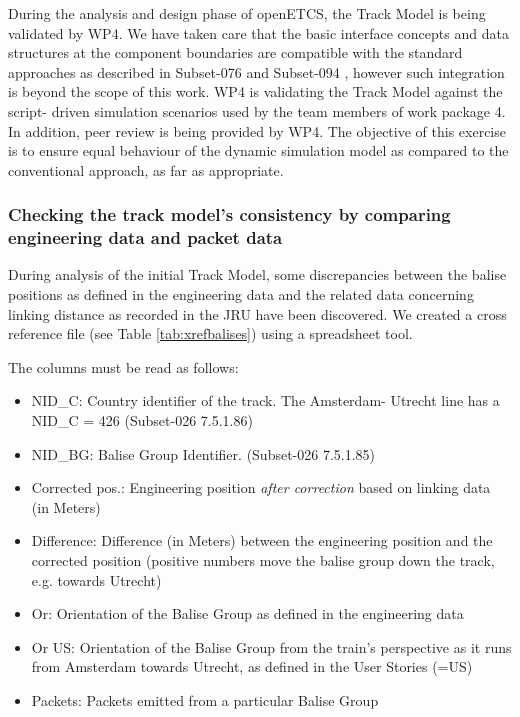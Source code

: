 \documentclass{template/openetcs_article}
\begin{document}
During the analysis and design phase of openETCS, the Track Model is being validated by WP4. We have taken care that the basic interface concepts and data structures at the component boundaries are compatible with the standard approaches as described in Subset-076 \cite{Subset076} and Subset-094 \cite{Subset094}, however such integration is beyond the scope of this work.\newline 
WP4 is validating the Track Model against the script- driven simulation scenarios used by the team members of work package 4. In addition, peer review is being provided by WP4.\newline
The objective of this exercise is to ensure equal behaviour of the dynamic simulation model as compared to the conventional approach, as far as appropriate. 

\subsubsection{Checking the track model's consistency by comparing engineering data and packet data}

During analysis of the initial Track Model, some discrepancies between the balise positions as defined in the engineering data and the related data concerning linking distance as recorded in the JRU have been discovered. We created a cross reference file (see Table \ref{tab:xrefbalises}) using a spreadsheet tool. 

The columns must be read as follows:
\begin{itemize}
 \item NID\_C: Country identifier of the track. The Amsterdam- Utrecht line has a NID\_C = 426 (Subset-026 7.5.1.86)\cite{SRS026-7}
 \item NID\_BG: Balise Group Identifier. (Subset-026 7.5.1.85)\cite{SRS026-7}
 \item Corrected pos.: Engineering position \emph{after correction} based on linking data (in Meters)
 \item Difference: Difference (in Meters) between the engineering position and the corrected position (positive numbers move the balise group down the track, e.g. towards Utrecht)
 \item Or: Orientation of the Balise Group as defined in the engineering data
 \item Or US: Orientation of the Balise Group from the train's perspective as it runs from Amsterdam towards Utrecht, as defined in the User Stories (=US)
 \item Packets: Packets emitted from a particular Balise Group 
\end{itemize}
\end{document}

